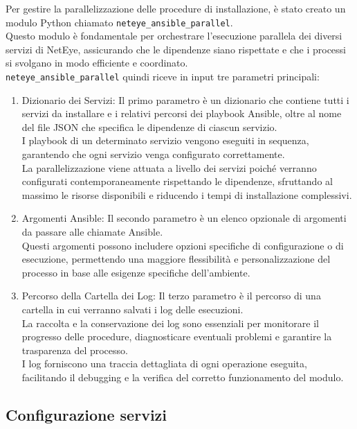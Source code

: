 Per gestire la parallelizzazione delle procedure di installazione, è stato
creato un modulo Python chiamato \texttt{neteye\_ansible\_parallel}.\\ Questo modulo
è fondamentale per orchestrare l'esecuzione parallela dei diversi servizi di NetEye,
assicurando che le dipendenze siano rispettate e che i processi si svolgano in
modo efficiente e coordinato.\\ \texttt{neteye\_ansible\_parallel} quindi riceve
in input tre parametri principali:
\begin{enumerate}
  \item Dizionario dei Servizi: Il primo parametro è un dizionario che contiene
    tutti i servizi da installare e i relativi percorsi dei playbook Ansible, oltre
    al nome del file JSON che specifica le dipendenze di ciascun servizio.\\ I playbook
    di un determinato servizio vengono eseguiti in sequenza, garantendo che ogni
    servizio venga configurato correttamente.\\ La parallelizzazione viene
    attuata a livello dei servizi poiché verranno configurati contemporaneamente
    rispettando le dipendenze, sfruttando al massimo le risorse disponibili e riducendo
    i tempi di installazione complessivi.

  \item Argomenti Ansible: Il secondo parametro è un elenco opzionale di
    argomenti da passare alle chiamate Ansible.\\ Questi argomenti possono
    includere opzioni specifiche di configurazione o di esecuzione, permettendo una
    maggiore flessibilità e personalizzazione del processo in base alle esigenze
    specifiche dell'ambiente.

  \item Percorso della Cartella dei Log: Il terzo parametro è il percorso di una
    cartella in cui verranno salvati i log delle esecuzioni.\\ La raccolta e la
    conservazione dei log sono essenziali per monitorare il progresso delle
    procedure, diagnosticare eventuali problemi e garantire la trasparenza del processo.\\
    I log forniscono una traccia dettagliata di ogni operazione eseguita,
    facilitando il debugging e la verifica del corretto funzionamento del modulo.
\end{enumerate}

\subsection{Configurazione servizi}
\label{sub:configurazione_parallelizzazione}

